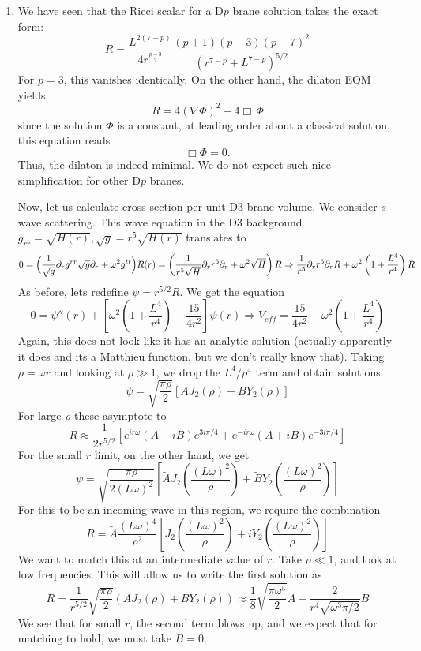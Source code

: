 \documentclass[11pt, class=article, crop=false]{standalone}
\begin{document}
\begin{enumerate}
	
	\item We have seen that the Ricci scalar for a D$p$ brane solution takes the exact form:
	\[
		R = \frac{L^{2(7-p)}}{4 r^{\frac{p-3}{2}}} \frac{(p+1) (p-3) (p-7)^2}{(r^{7-p} + L^{7-p})^{5/2}}
	\]
	For $p = 3$, this vanishes identically. On the other hand, the dilaton EOM yields
	\[
		R = 4 (\nabla \Phi)^2 - 4 \Box\, \Phi
	\]
	since the solution $\Phi$ is a constant, at leading order about a classical solution, this equation reads
	\[
		\Box \Phi = 0.
	\]
	Thus, the dilaton is indeed minimal. We do not expect such nice simplification for other D$p$ branes. 
	
	Now, let us calculate cross section per unit D3 brane volume.
	We consider $s$-wave scattering. This wave equation in the D3 background $g_{rr} = \sqrt{H(r)}, \sqrt g = r^5 \sqrt{H(r)}$ translates to
	\[
		0 = \Big(\frac{1}{\sqrt g} \partial_r g^{rr} \sqrt{g} \partial_r  + \omega^2 g^{tt} \Big) R(r)  = \left( \frac{1}{r^5 \sqrt{H}} \partial_r r^5 \partial_r + \omega^2 \sqrt{H}  \right) R \Rightarrow \frac{1}{r^5} \partial_r r^5 \partial_r R + \omega^2 \left(1 + \frac{L^4}{r^4} \right) R
	\]
	As before, lets redefine $\psi = r^{5/2} R$. We get the equation
	\[
		0 = \psi''(r) + \left[\omega^2 \left(1 + \frac{L^4}{r^4}\right)  - \frac{15}{4 r^2} \right] \psi(r) \Rightarrow V_{eff} = \frac{15}{4 r^2} - \omega^2 \left(1 + \frac{L^4}{r^4}\right)
	\]
	Again, this does not look like it has an analytic solution (actually apparently it does and its a Matthieu function, but we don't really know that). Taking $\rho = \omega r$ and looking at $\rho \gg 1$, we drop the $L^4/\rho^4$ term and obtain solutions
	\[
		\psi = \sqrt{\frac{\pi \rho}{2}} \left[A J_2 (\rho) + B Y_2(\rho)\right]
	\]
	For large $\rho$ these asymptote to
	\[
		R \approx \frac{1}{2 r^{5/2}} [e^{i r \omega} (A - i B ) e^{3 i \pi/4} + e^{-i r \omega} (A  + i B) e^{-3i \pi/4}]
	\]
	For the small $r$ limit, on the other hand, we get
	\[
		\psi = \sqrt{\frac{\pi \rho}{2  (L \omega)^2}} \left[\tilde A J_2 (\frac{(L \omega)^2}{\rho}) + \tilde B Y_2(\frac{(L \omega)^2}{\rho}) \right]
	\]
	For this to be an incoming wave in this region, we require the combination 
	\begin{equation} \label{eq:D3inc}
		R = \tilde A \frac{(L \omega)^4}{\rho^2} \left[ J_2 (\frac{(L \omega)^2}{\rho}) + i Y_2(\frac{(L \omega)^2}{\rho}) \right]
	\end{equation}
	We want to match this at an intermediate value of $r$. Take $\rho \ll 1$, and look at low frequencies. This will allow us to write the first solution as
	\[
		R = \frac{1}{r^{5/2}} \sqrt{\frac{\pi \rho}{2}} (A J_2(\rho) + B Y_2(\rho)) \approx \frac18 \sqrt{\frac{\pi \omega^5}{2}} A - \frac{2}{r^4 \sqrt{\omega^3 \pi/2}} B
	\]
	We see that for small $r$, the second term blows up, and we expect that for matching to hold, we must take $B=0$. 
	

\end{enumerate}
\end{document}
